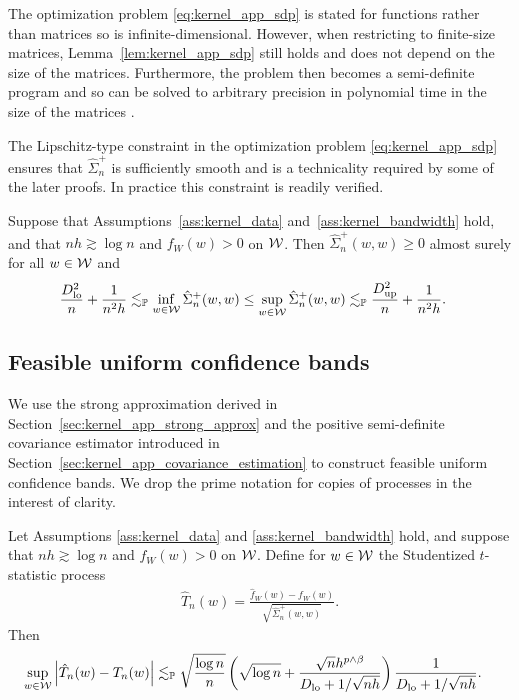 The optimization problem \eqref{eq:kernel_app_sdp} is stated for functions
rather than
matrices so is infinite-dimensional. However, when restricting to finite-size
matrices, Lemma~\ref{lem:kernel_app_sdp} still holds and does not depend on the
size
of the matrices. Furthermore, the problem then becomes a semi-definite program
and so can be solved to arbitrary precision in polynomial time in the size of
the matrices \citep{laurent2005semidefinite}.

The Lipschitz-type constraint in the optimization problem
\eqref{eq:kernel_app_sdp}
ensures that $\hat \Sigma_n^+$ is sufficiently smooth and is a technicality
required by some of the later proofs. In practice this constraint is readily
verified.

\begin{lemma}
  \label{lem:kernel_app_variance_estimator_bounds}

  Suppose that Assumptions~\ref{ass:kernel_data}
  and~\ref{ass:kernel_bandwidth} hold, and that
  $n h \gtrsim \log n$ and $f_W(w) > 0$ on $\mathcal{W}$.
  Then $\hat \Sigma_n^+(w,w) \geq 0$
  almost surely for all $w \in \mathcal{W}$ and
  \begin{align*}
    \frac{D_{\textup{lo}}^2}{n} + \frac{1}{n^2h}
    &\lesssim_{\mathbb{P}}
    \inf_{w \in \mathcal{W}} \hat \Sigma_n^+(w,w)
    \leq
    \sup_{w \in \mathcal{W}} \hat \Sigma_n^+(w,w)
    \lesssim_{\mathbb{P}}
    \frac{D_{\textup{up}}^2}{n} + \frac{1}{n^2h}.
  \end{align*}

\end{lemma}

\subsection{Feasible uniform confidence bands}

We use the strong approximation derived in
Section~\ref{sec:kernel_app_strong_approx} and the
positive semi-definite covariance estimator introduced in
Section~\ref{sec:kernel_app_covariance_estimation} to construct feasible
uniform
confidence bands. We drop the prime notation for copies of processes
in the interest of clarity.

\begin{lemma}
  \label{lem:kernel_app_studentized_t_statistic}

  Let Assumptions \ref{ass:kernel_data} and
  \ref{ass:kernel_bandwidth} hold, and suppose that
  $n h \gtrsim \log n$ and $f_W(w) > 0$ on $\mathcal{W}$.
  Define for $w \in \mathcal{W}$
  the Studentized $t$-statistic process
  \begin{align*}
    \hat T_n(w) = \frac{\hat f_W(w) - f_W(w)}
    {\sqrt{\hat\Sigma_n^+(w,w)}}.
  \end{align*}
  Then
  \begin{align*}
    \sup_{w \in \mathcal{W}}
    \left| \hat T_n(w) - T_n(w) \right|
    &\lesssim_{\mathbb{P}}
    \sqrt{\frac{\log n}{n}}
    \left(
      \sqrt{\log n} + \frac{\sqrt n h^{p \wedge \beta}}
      {D_{\textup{lo}} + 1/\sqrt{n h}}
    \right)
    \frac{1}{D_{\textup{lo}} + 1/\sqrt{n h}}.
  \end{align*}

\end{lemma}

